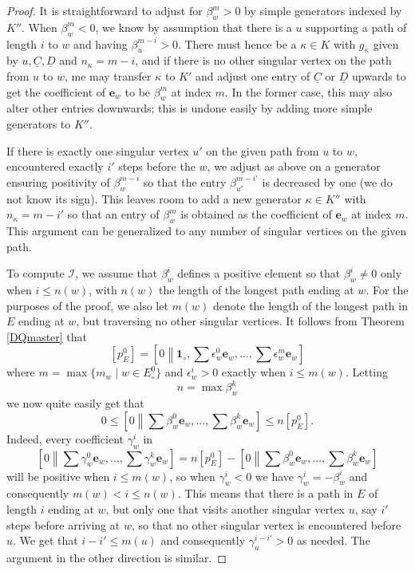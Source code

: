 \documentclass[12pt]{amsbook}%
\newcommand{\ee}{{\mathbf e}}
\theoremstyle{defin}
\theoremstyle{remark}
\numberwithin{equation}{chapter}
\numberwithin{theor}{section}
\newcommand{\oXe}[2]{\left[#1\left\|{#2}\right.\right]}
\newcommand{\singX}{{\circ}}
\newcommand{\uu}{\mathbf{1}}
\begin{document}
\begin{proof}
It is straightforward to adjust for $\beta^m_w>0$ by simple generators indexed by $K''$. When $\beta^m_w<0$, we know by assumption that there is a $u$ supporting a path of length $i$ to $w$ and having $\beta^{m-i}_u>0$. There must hence be a $\kappa\in K$ with $g_\kappa$ given by $u,\underline{C},\underline{D}$ and $n_{\kappa}=m-i$, and if there is no other singular vertex on the path from $u$ to $w$, me may transfer $\kappa$ to $K'$ and adjust one entry of $\underline{C}$ or $\underline{D}$ upwards to get the coefficient of $\ee_w$ to be $\beta^m_w$ at index $m$. In the former case, this may also alter other entries downwards; this is undone easily by adding more simple generators to $K''$. 

If there is exactly one singular vertex $u'$ on the given path from $u$ to $w$, encountered exactly $i'$ steps before the $w$, we adjust as above on a generator ensuring positivity of $\beta^{m-i}_w$ so that the entry $\beta^{m-i'}_{u'}$ is decreased by one (we do not know its sign). This leaves room to add a new generator $\kappa\in K''$ with $n_{\kappa}=m-i'$ so that an entry of $\beta^m_w$ is obtained as the coefficient of $\ee_w$ at index $m$. This argument can be generalized to any number of singular vertices on the given path.

To compute $\mathcal I$, we assume that $\beta^i_w$ defines a positive element so that $\beta^i_w\not=0$ only when $i\leq n(w)$, with $n(w)$ the length of the longest path ending at $w$.  For the purposes of the proof, we also let  $m(w)$ denote the length of the longest path in $E$ ending at $w$, but traversing no other singular vertices. It follows from Theorem \ref{DQmaster} that
\[
[p^0_E]=\oXe{0}{\uu_\singX,\textstyle \sum \epsilon^0_w\ee_w,\dots,\sum \epsilon^{m}_w\ee_w}
\]
where $m=\max\{ m_w\mid w\in E^0_\singX\}$ and  $\epsilon^i_w>0$ exactly when $i\leq m(w)$. Letting 
\[
n=\max \beta^k_w
\]
we now quite easily get that 
\[
0\leq\oXe{0}{\textstyle \sum \beta^0_w\ee_w,\dots,\sum \beta^k_w\ee_w}\leq n[p^0_E].
\]
Indeed, every coefficient $\gamma^i_w$ in
\[
\oXe{0}{\textstyle \sum \gamma^0_w\ee_w,\dots,\sum \gamma^k_w\ee_w}= n[p^0_E]-\oXe{0}{\textstyle \sum \beta^0_w\ee_w,\dots,\sum \beta^k_w\ee_w}
\]
will be positive when $i\leq m(w)$, so when  $\gamma^i_w<0$ we have $\gamma^i_w=-\beta^i_w$ and consequently $m(w)<i\leq n(w)$. This means that there is a path in $E$ of length $i$ ending at $w$, but only one that visits another singular vertex $u$, say $i'$ steps before arriving at $w$, so that no other singular vertex is encountered before $u$. We get that $i-i'\leq m(u)$ and consequently $\gamma^{i-i'}_u>0$ as needed. The argument in the other direction is similar.
\end{proof}
\end{document}
